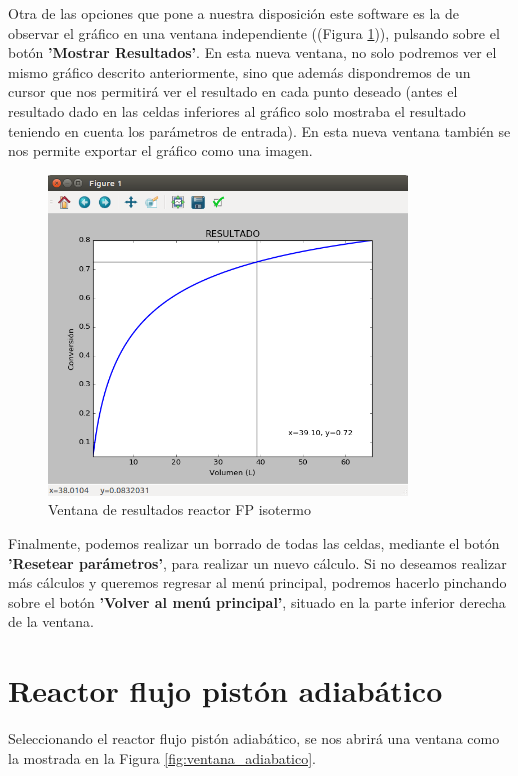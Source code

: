 Otra de las opciones que pone a nuestra disposición este software es la de observar el gráfico en una ventana independiente ((Figura \ref{fig:ventana_graficas_iso})), pulsando sobre el botón \textbf{'Mostrar Resultados'}. En esta nueva ventana, no solo podremos ver el mismo gráfico descrito anteriormente, sino que además dispondremos de un cursor que nos permitirá ver el resultado en cada punto deseado (antes el resultado dado en las celdas inferiores al gráfico solo mostraba el resultado teniendo en cuenta los parámetros de entrada). En esta nueva ventana también se nos permite exportar el gráfico como una imagen.

\begin{figure}[h!]
	\begin{center}
		\includegraphics[width=0.85\textwidth]{./imagenes/reactor_fp/isotermo2.png}\caption{Ventana de resultados reactor FP isotermo}\label{fig:ventana_graficas_iso}
	\end{center}
\end{figure}

Finalmente, podemos realizar un borrado de todas las celdas, mediante el botón \textbf{'Resetear parámetros'}, para realizar un nuevo cálculo. Si no deseamos realizar más cálculos y queremos regresar al menú principal, podremos hacerlo pinchando sobre el botón \textbf{'Volver al menú principal'}, situado en la parte inferior derecha de la ventana.


\section{Reactor flujo pistón adiabático}
Seleccionando el reactor flujo pistón adiabático, se nos abrirá una ventana como la mostrada en la Figura \ref{fig:ventana_adiabatico}.

